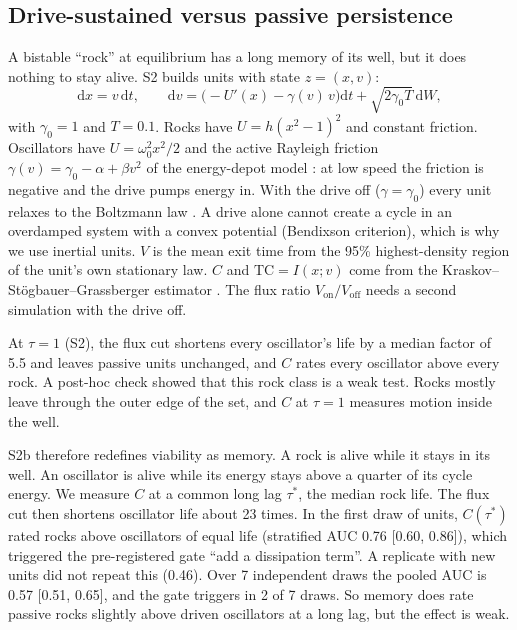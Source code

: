 \documentclass[11pt]{article}
\newcommand{\TC}{\mathrm{TC}}
\newcommand{\Von}{V_{\mathrm{on}}}
\newcommand{\Voff}{V_{\mathrm{off}}}
\begin{document}
\subsection{Drive-sustained versus passive persistence}
\label{sec:flux}
A bistable ``rock'' at equilibrium has a long memory of its well, but it does nothing to stay alive. S2 builds units with
state $z=(x,v)$:
\begin{equation}
  \mathrm{d}x = v\,\mathrm{d}t, \qquad \mathrm{d}v = \bigl(-U'(x) - \gamma(v)\,v\bigr)\mathrm{d}t + \sqrt{2\gamma_0 T}\,\mathrm{d}W ,
\end{equation}
with $\gamma_0=1$ and $T=0.1$. Rocks have $U = h(x^2-1)^2$ and constant friction. Oscillators have
$U = \omega_0^2 x^2/2$ and the active Rayleigh friction $\gamma(v) = \gamma_0 - \alpha + \beta v^2$ of the
energy-depot model \cite{SchweitzerEbelingTilch98,Romanczuk12}: at low speed the friction is negative and the drive
pumps energy in. With the drive off ($\gamma = \gamma_0$) every unit relaxes to the Boltzmann law \cite{Kramers40}.
A drive alone cannot create a cycle in an overdamped system with a convex potential (Bendixson criterion), which is why
we use inertial units. $V$ is the mean exit time from the 95\% highest-density region of the unit's own stationary law.
$C$ and $\TC = I(x;v)$ come from the Kraskov--St\"ogbauer--Grassberger estimator \cite{Kraskov04}. The flux ratio
$\Von/\Voff$ needs a second simulation with the drive off.

At $\tau=1$ (S2), the flux cut shortens every oscillator's life by a median factor of 5.5 and leaves passive units
unchanged, and $C$ rates every oscillator above every rock. A post-hoc check showed that this rock class is a weak test. Rocks mostly leave through the outer edge of the set, and $C$ at $\tau=1$ measures motion inside the well.

S2b therefore
redefines viability as memory. A rock is alive while it stays in its well. An oscillator is alive while its
energy stays above a quarter of its cycle energy. We measure $C$ at a common long lag $\tau^\ast$, the median rock life.
The flux cut then shortens oscillator life about 23 times. In the first draw of units, $C(\tau^\ast)$ rated rocks above
oscillators of equal life (stratified AUC 0.76 [0.60, 0.86]), which triggered the pre-registered gate ``add a
dissipation term''. A replicate with new units did not repeat this (0.46). Over 7 independent draws the pooled AUC is
0.57 [0.51, 0.65], and the gate triggers in 2 of 7 draws. So memory does rate passive rocks slightly above driven
oscillators at a long lag, but the effect is weak.
\end{document}
